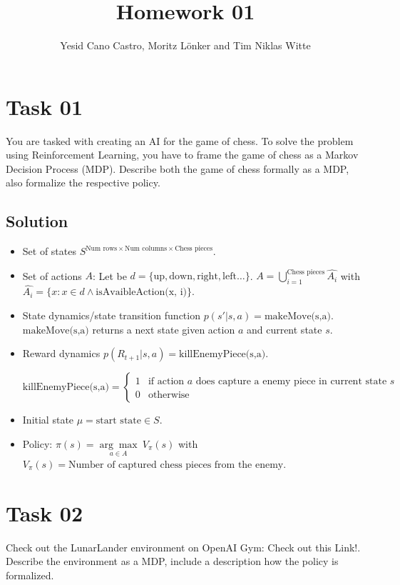 \documentclass[a4paper,12pt]{scrartcl}
\title{Homework 01}
\author{Yesid Cano Castro, Moritz Lönker and Tim Niklas Witte}
\date{}
\begin{document}
{
\let\clearpage\relax
\maketitle
}

\section*{Task 01}


You are tasked with creating an AI for the game of chess. To solve the problem
using Reinforcement Learning, you have to frame the game of chess as a Markov
Decision Process (MDP). Describe both the game of chess formally as a MDP,
also formalize the respective policy.

\subsection*{Solution}

\begin{itemize}
 \item Set of states $S^{ \textrm{Num rows} \times \textrm{Num columns} \times \textrm{Chess pieces} }$.
 \item Set of actions $A$: Let be $d = \{\textrm{up}, \textrm{down}, \textrm{right}, \textrm{left}\dots\}$.
  $A = \bigcup\limits_{i=1}^{\textrm{Chess pieces}} \hat{A_i}$ with $\hat{A_i} = \{x : x\in d \land \textrm{isAvaibleAction(x, i)} \}$. 
  \item State dynamics/state transition function $p(s'|s,a) = \textrm{makeMove(s,a)}$. $\textrm{makeMove(s,a)}$ returns a next state given action $a$ and current state $s$.
  \item Reward dynamics $p(R_{t+1}|s,a) = \textrm{killEnemyPiece(s,a)}$.
  
  $
  \textrm{killEnemyPiece(s,a)} =
  \left\{
	\begin{array}{ll}
		1  & \mbox{if } \textrm{action $a$ does capture a enemy piece in current state $s$} \\
		0 & \mbox{otherwise }
	\end{array}
\right.
$
  \item Initial state $\mu = \textrm{start state} \in S$.
  
  \item Policy: $\pi(s) = \underset{a \in A}{\arg\max} \ V_\pi(s)$ with $V_\pi(s) = \textrm{Number of captured chess pieces from the enemy}$.   
\end{itemize}

\section*{Task 02}
Check out the LunarLander environment on OpenAI Gym: Check out this Link!.
Describe the environment as a MDP, include a description how the policy is
formalized.
\end{document}
